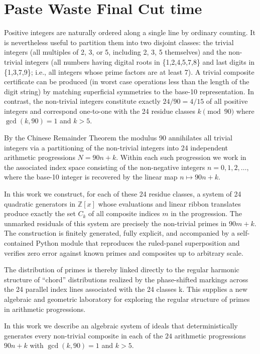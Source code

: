 \documentclass[11pt,a4paper]{article}
\begin{document}
\section{Paste Waste Final Cut time}
Positive integers are naturally ordered along a single line by ordinary counting. It is nevertheless useful to partition them into two disjoint classes: the trivial integers (all multiples of 2, 3, or 5, including 2, 3, 5 themselves) and the non-trivial integers (all numbers having digital roots in \{1,2,4,5,7,8\} and last digits in \{1,3,7,9\}; i.e., all integers whose prime factors are at least 7). A trivial composite certificate can be produced (in worst case operations less than the length of the digit string) by matching superficial symmetries to the base-10 representation. In contrast, the non-trivial integers constitute exactly \(24/90=4/15\) of all positive integers and correspond one-to-one with the 24 residue classes \(k\pmod{90}\) where \(\gcd(k,90)=1\) and \(k>5\).

By the Chinese Remainder Theorem the modulus 90 annihilates all trivial integers via a partitioning of the non-trivial integers into 24 independent arithmetic progressions \(N=90n+k\). Within each such progression we work in the associated index space consisting of the non-negative integers \(n=0,1,2,\dots\), where the base-10 integer is recovered by the linear map \(n\mapsto90n+k\).

In this work we construct, for each of these 24 residue classes, a system of 24 quadratic generators in \(\mathbb{Z}[x]\) whose evaluations and linear ribbon translates produce exactly the set \(C_k\) of all composite indices \(m\) in the progression. The unmarked residuals of this system are precisely the non-trivial primes in \(90m+k\). The construction is finitely generated, fully explicit, and accompanied by a self-contained Python module that reproduces the ruled-panel superposition and verifies zero error against known primes and composites up to arbitrary scale.

The distribution of primes is thereby linked directly to the regular harmonic structure of “chord” distributions realized by the phase-shifted markings across the 24 parallel index lines associated with the 24 classes k. This supplies a new algebraic and geometric laboratory for exploring the regular structure of primes in arithmetic progressions.





In this work we describe an algebraic system of ideals that deterministically generates every non-trivial composite in each of the $24$ arithmetic progressions $90n+k$ with $\gcd(k,90)=1$ and $k>5$.
\end{document}
